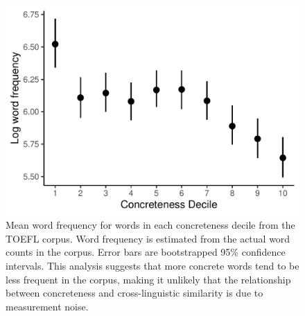 \documentclass[9pt,twoside,lineno]{pnas-new}
\begin{document}
\pagebreak
\clearpage



\begin{figure}[h]
\centering
\includegraphics[width=5in]{suppfigs/conc_freq_control.pdf}
 \caption{Mean word frequency for words in each concreteness decile from the TOEFL corpus. Word frequency is estimated from the actual word counts in the corpus. Error bars are bootstrapped 95\% confidence intervals. This analysis suggests that more concrete words tend to be less frequent in the corpus, making it unlikely that the relationship between concreteness and cross-linguistic similarity is due to measurement noise.}
\end{figure}

\pagebreak
 \clearpage
\end{document}
